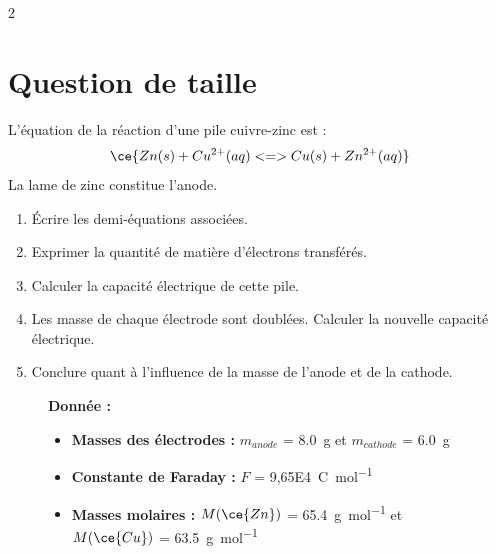 \documentclass[a4paper,11pt,fleqn]{article}%
\begin{document}
\begin{multicols}{2}
\section{Question de taille}
L'équation de la réaction d'une pile cuivre-zinc est :
$$\ce{Zn(s) + Cu^{2+}(aq) <=> Cu(s) + Zn^{2+}(aq)}$$
La lame de zinc constitue l'anode.
\begin{enumerate}
    \item Écrire les demi-équations associées.
    \item Exprimer la quantité de matière d'électrons transférés.
    \item Calculer la capacité électrique de cette pile.
    \item Les masse de chaque électrode sont doublées. Calculer la nouvelle capacité électrique.
    \item Conclure quant à l'influence de la masse de l'anode et de la cathode.
\end{enumerate}
\begin{figure}[H]
    \begin{minipage}{\linewidth}
    \textbf{Donnée :}
    \begin{itemize}
        \item \textbf{Masses des électrodes :} $m_{anode}$ = \SI{8,0}{\gram} et $m_{cathode}$ = \SI{6,0}{\gram}
        \item \textbf{Constante de Faraday :} $F$ = \SI{9,65E4}{\coulomb\per\mole}
        \item \textbf{Masses molaires :} $M(\ce{Zn})$ = \SI{65,4}{\gram\per\mole} et $M(\ce{Cu})$ = \SI{63,5}{\gram\per\mole}
    \end{itemize}
    \end{minipage}
\end{figure}


\end{multicols}
\end{document}

